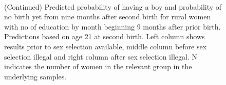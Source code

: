 \documentclass[12pt,letterpaper]{article}
\begin{document}
\begin{figure}[htpb]
{\begin{minipage}{0.31\textwidth}
        \captionsetup[subfigure]{labelformat=empty,position=top,captionskip=-1pt,farskip=-0.5pt}
        \\
        \captionsetup[subfigure]{labelformat=parens}
    \end{minipage}
}
\setcounter{subfigure}{6}
\caption{(Continued) Predicted probability of having a boy and probability of
no birth yet from nine months after second birth for rural
women with no of education by month beginning 9 months after prior birth. 
Predictions based on age 21 at second birth.
Left column shows results prior to sex selection available, middle column before
sex selection illegal and right column after sex selection illegal.
N indicates the number of women in the relevant group in the underlying samples.
}
\end{figure}


\end{document}
